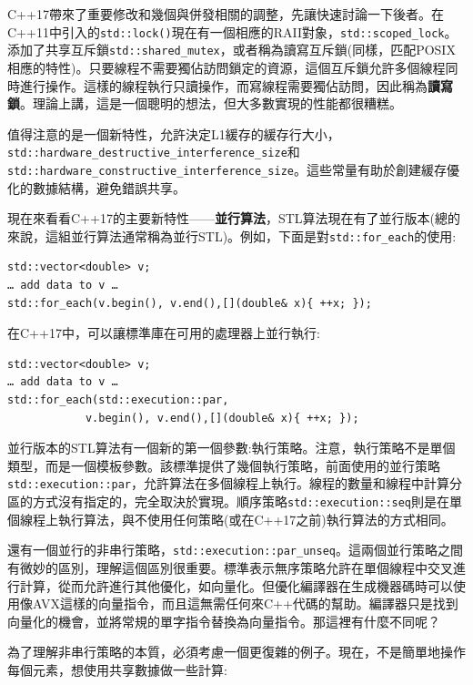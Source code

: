 C++17帶來了重要修改和幾個與併發相關的調整，先讓快速討論一下後者。在C++11中引入的\texttt{std::lock()}現在有一個相應的RAII對象，\texttt{std::scoped\_lock}。添加了共享互斥鎖\texttt{std::shared\_mutex}，或者稱為讀寫互斥鎖(同樣，匹配POSIX相應的特性)。只要線程不需要獨佔訪問鎖定的資源，這個互斥鎖允許多個線程同時進行操作。這樣的線程執行只讀操作，而寫線程需要獨佔訪問，因此稱為\textbf{讀寫鎖}。理論上講，這是一個聰明的想法，但大多數實現的性能都很糟糕。

值得注意的是一個新特性，允許決定L1緩存的緩存行大小，\texttt{std::hardware\_destructive\_\linebreak interference\_size}和\texttt{std::hardware\_constructive\_interference\_size}。這些常量有助於創建緩存優化的數據結構，避免錯誤共享。

現在來看看C++17的主要新特性——\textbf{並行算法}，STL算法現在有了並行版本(總的來說，這組並行算法通常稱為並行STL)。例如，下面是對\texttt{std::for\_each}的使用:

\begin{lstlisting}[style=styleCXX]
std::vector<double> v;
… add data to v … 
std::for_each(v.begin(), v.end(),[](double& x){ ++x; });
\end{lstlisting}

在C++17中，可以讓標準庫在可用的處理器上並行執行:

\begin{lstlisting}[style=styleCXX]
std::vector<double> v;
… add data to v … 
std::for_each(std::execution::par,
			v.begin(), v.end(),[](double& x){ ++x; });
\end{lstlisting}

並行版本的STL算法有一個新的第一個參數:執行策略。注意，執行策略不是單個類型，而是一個模板參數。該標準提供了幾個執行策略，前面使用的並行策略\texttt{std::execution::par}，允許算法在多個線程上執行。線程的數量和線程中計算分區的方式沒有指定的，完全取決於實現。順序策略\texttt{std::execution::seq}則是在單個線程上執行算法，與不使用任何策略(或在C++17之前)執行算法的方式相同。

還有一個並行的非串行策略，\texttt{std::execution::par\_unseq}。這兩個並行策略之間有微妙的區別，理解這個區別很重要。標準表示無序策略允許在單個線程中交叉進行計算，從而允許進行其他優化，如向量化。但優化編譯器在生成機器碼時可以使用像AVX這樣的向量指令，而且這無需任何來C++代碼的幫助。編譯器只是找到向量化的機會，並將常規的單字指令替換為向量指令。那這裡有什麼不同呢？

為了理解非串行策略的本質，必須考慮一個更復雜的例子。現在，不是簡單地操作每個元素，想使用共享數據做一些計算:

